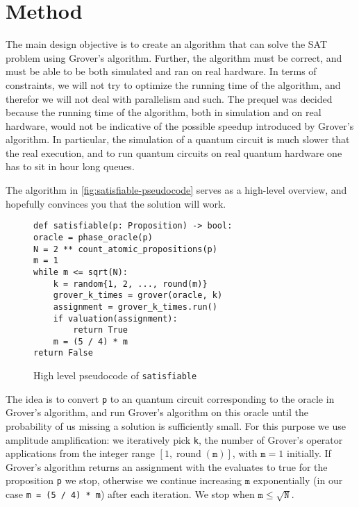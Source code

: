 \section{Method}\label{sec:method}

The main design objective is to create an algorithm that can solve the SAT problem using Grover's algorithm.
Further, the algorithm must be correct, and must be able to be both simulated and ran on real hardware.
In terms of constraints, we will not try to optimize the running time of the algorithm, and therefor we will not deal with parallelism and such.
The prequel was decided because the running time of the algorithm, both in simulation and on real hardware, would not be indicative of the possible speedup introduced by Grover's algorithm.
In particular, the simulation of a quantum circuit is much slower that the real execution, and to run quantum circuits on real quantum hardware one has to sit in hour long queues.

The algorithm in \autoref{fig:satisfiable-pseudocode} serves as a high-level overview, and hopefully convinces you that the solution will work.

\begin{figure}
\centering
\begin{verbatim}
def satisfiable(p: Proposition) -> bool:
oracle = phase_oracle(p)
N = 2 ** count_atomic_propositions(p)
m = 1
while m <= sqrt(N):
    k = random{1, 2, ..., round(m)}
    grover_k_times = grover(oracle, k)
    assignment = grover_k_times.run()
    if valuation(assignment):
        return True
    m = (5 / 4) * m
return False
\end{verbatim}
\caption{High level pseudocode of \texttt{satisfiable} }
\label{fig:satisfiable-pseudocode}
\end{figure}

The idea is to convert \texttt{p} to an quantum circuit corresponding to the oracle in Grover's algorithm, and run Grover's algorithm  on this oracle until the probability of us missing a solution is sufficiently small.
For this purpose we use amplitude amplification:
we iteratively pick \texttt{k}, the number of Grover's operator applications from the integer range $[1, \operatorname{round}(\texttt{m})]$, with $\texttt{m} = 1$ initially.
If Grover's algorithm returns an assignment with the evaluates to true for the proposition \texttt{p} we stop, otherwise we continue increasing $\texttt{m}$ exponentially (in our case \texttt{m = (5 / 4) * m}) after each iteration.
We stop when $\texttt{m} \leq \sqrt{\texttt{N}}$.
